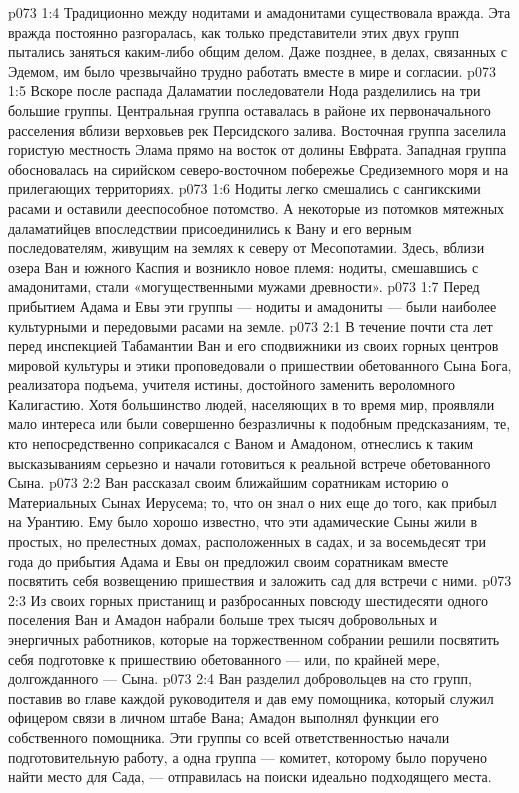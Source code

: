 \vs p073 1:4 Традиционно между нодитами и амадонитами существовала вражда. Эта вражда постоянно разгоралась, как только представители этих двух групп пытались заняться каким\hyp{}либо общим делом. Даже позднее, в делах, связанных с Эдемом, им было чрезвычайно трудно работать вместе в мире и согласии.
\vs p073 1:5 Вскоре после распада Даламатии последователи Нода разделились на три большие группы. Центральная группа оставалась в районе их первоначального расселения вблизи верховьев рек Персидского залива. Восточная группа заселила гористую местность Элама прямо на восток от долины Евфрата. Западная группа обосновалась на сирийском северо\hyp{}восточном побережье Средиземного моря и на прилегающих территориях.
\vs p073 1:6 Нодиты легко смешались с сангикскими расами и оставили дееспособное потомство. А некоторые из потомков мятежных даламатийцев впоследствии присоединились к Вану и его верным последователям, живущим на землях к северу от Месопотамии. Здесь, вблизи озера Ван и южного Каспия и возникло новое племя: нодиты, смешавшись с амадонитами, стали «могущественными мужами древности».
\vs p073 1:7 Перед прибытием Адама и Евы эти группы --- нодиты и амадониты --- были наиболее культурными и передовыми расами на земле.
\vs p073 2:1 В течение почти ста лет перед инспекцией Табамантии Ван и его сподвижники из своих горных центров мировой культуры и этики проповедовали о пришествии обетованного Сына Бога, реализатора подъема, учителя истины, достойного заменить вероломного Калигастию. Хотя большинство людей, населяющих в то время мир, проявляли мало интереса или были совершенно безразличны к подобным предсказаниям, те, кто непосредственно соприкасался с Ваном и Амадоном, отнеслись к таким высказываниям серьезно и начали готовиться к реальной встрече обетованного Сына.
\vs p073 2:2 Ван рассказал своим ближайшим соратникам историю о Материальных Сынах Иерусема; то, что он знал о них еще до того, как прибыл на Урантию. Ему было хорошо известно, что эти адамические Сыны жили в простых, но прелестных домах, расположенных в садах, и за восемьдесят три года до прибытия Адама и Евы он предложил своим соратникам вместе посвятить себя возвещению пришествия и заложить сад для встречи с ними.
\vs p073 2:3 Из своих горных пристанищ и разбросанных повсюду шестидесяти одного поселения Ван и Амадон набрали больше трех тысяч добровольных и энергичных работников, которые на торжественном собрании решили посвятить себя подготовке к пришествию обетованного --- или, по крайней мере, долгожданного --- Сына.
\vs p073 2:4 Ван разделил добровольцев на сто групп, поставив во главе каждой руководителя и дав ему помощника, который служил офицером связи в личном штабе Вана; Амадон выполнял функции его собственного помощника. Эти группы со всей ответственностью начали подготовительную работу, а одна группа --- комитет, которому было поручено найти место для Сада, --- отправилась на поиски идеально подходящего места.
